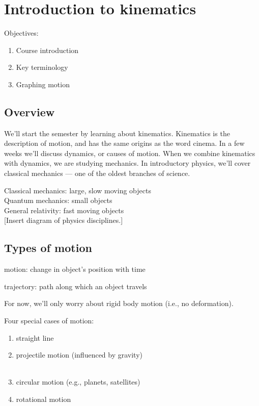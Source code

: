 \section{Introduction to kinematics}
Objectives:
\begin{enumerate}
\item Course introduction
\item Key terminology
\item Graphing motion
\end{enumerate}

\subsection{Overview}
We'll start the semester by learning about kinematics. Kinematics is the description of motion, and has the same origins as the word cinema. In a few weeks we'll discuss dynamics, or causes of motion. When we combine kinematics with dynamics, we are studying mechanics. In introductory physics, we'll cover classical mechanics --- one of the oldest branches of science.

Classical mechanics: large, slow moving objects\\
Quantum mechanics: small objects\\
General relativity: fast moving objects\\

[Insert diagram of physics disciplines.]
\vspace{4cm}

\subsection{Types of motion}
motion: change in object's position with time

trajectory: path along which an object travels

For now, we'll only worry about rigid body motion (i.e., no deformation).

Four special cases of motion:

\begin{enumerate}[itemsep=2cm]
\item straight line
\item projectile motion (influenced by gravity)\\ \\
\item circular motion (e.g., planets, satellites)
\item rotational motion\\ \\ \\
\end{enumerate}


